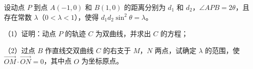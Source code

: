 \begin{question}
设动点 $P$ 到点 $A(-1,0)$ 和 $B(1,0)$ 的距离分别为 $d_1$ 和 $d_2$，$\angle APB=2\theta$，且存在常数 $\lambda$（$0<\lambda<1$），使得 $d_1d_2\sin^2\theta=\lambda$。

（1）证明：动点 $P$ 的轨迹 $C$ 为双曲线，并求出 $C$ 的方程；

（2）过点 $B$ 作直线交双曲线 $C$ 的右支于 $M$，$N$ 两点，试确定 $\lambda$ 的范围，使 $\overrightarrow{OM}\cdot\overrightarrow{ON}=0$，其中点 $O$ 为坐标原点。
\nopagebreak[4]
\begin{center}\end{center}
\nopagebreak[4]

\end{question}